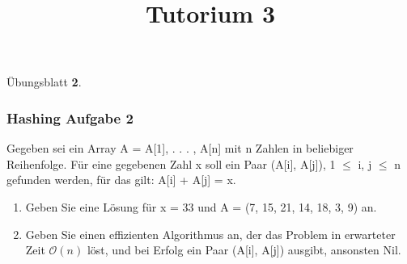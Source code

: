 
\title[Algorithmen I SS 14]{Tutorium 3}

\usepackage{alltt}




\begin{frame}
  \maketitle
\end{frame}

\begin{frame}
	\Huge
	\begin{center}
		Übungsblatt \textbf{2}.
	\end{center}
\end{frame}


\begin{frame}
	\frametitle{Hashing Aufgabe 2}
	Gegeben sei ein Array A = A[1], . . . , A[n] mit n Zahlen in beliebiger Reihenfolge.
	Für eine gegebenen Zahl x soll ein Paar (A[i], A[j]), 1 $\leq$ i, j $\leq$ n gefunden werden, für das
	gilt: A[i] + A[j] = x.

	\begin{enumerate}
		\item Geben Sie eine Lösung für x = 33 und A = (7, 15, 21, 14, 18, 3, 9) an.
		\item Geben Sie einen effizienten Algorithmus an, der das Problem in erwarteter Zeit $\mathcal{O}(n)$ löst, und bei Erfolg ein Paar (A[i], A[j]) ausgibt, ansonsten Nil.
	\end{enumerate}
\end{frame}

